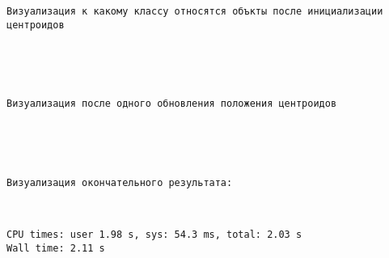 \documentclass[11pt]{article}
\begin{document}
    \begin{center}
    \end{center}
    { \hspace*{\fill} \\}
    
    \begin{Verbatim}[commandchars=\\\{\}]


Визуализация к какому классу относятся объкты после инициализации центроидов
\end{Verbatim}

    \begin{center}
    \end{center}
    { \hspace*{\fill} \\}
    
    \begin{Verbatim}[commandchars=\\\{\}]


Визуализация после одного обновления положения центроидов
\end{Verbatim}

    \begin{center}
    \end{center}
    { \hspace*{\fill} \\}
    
    \begin{Verbatim}[commandchars=\\\{\}]


Визуализация окончательного результата:
\end{Verbatim}

    \begin{center}
    \end{center}
    { \hspace*{\fill} \\}
    
    \begin{Verbatim}[commandchars=\\\{\}]
CPU times: user 1.98 s, sys: 54.3 ms, total: 2.03 s
Wall time: 2.11 s
\end{Verbatim}
\end{document}

